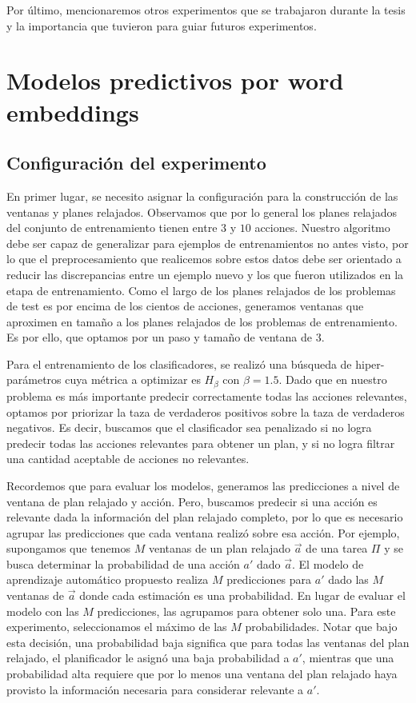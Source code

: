 Por último, mencionaremos otros experimentos que se trabajaron durante la tesis
y la importancia que tuvieron para guiar futuros experimentos.

\section{Modelos predictivos por word embeddings}
\label{exp:ad-hoc}

\subsection{Configuración del experimento}

En primer lugar, se necesito asignar la configuración para la construcción de
las ventanas y planes relajados.  Observamos que por lo general los planes
relajados del conjunto de entrenamiento tienen entre $3$ y $10$ acciones.
Nuestro algoritmo debe ser capaz de generalizar para ejemplos de entrenamientos
no antes visto, por lo que el preprocesamiento que realicemos sobre estos datos
debe ser orientado a reducir las discrepancias entre un ejemplo nuevo y los que
fueron utilizados en la etapa de entrenamiento. Como el largo de los planes
relajados de los problemas de test es por encima de los cientos de acciones,
generamos ventanas que aproximen en tamaño a los planes relajados de los
problemas de entrenamiento. Es por ello, que optamos por un paso y tamaño de
ventana de $3$.

Para el entrenamiento de los clasificadores, se realizó una búsqueda de
hiper-parámetros cuya métrica a optimizar es $H_{\beta}$ con $\beta = 1.5$. Dado
que en nuestro problema es más importante predecir correctamente todas las
acciones relevantes, optamos por priorizar la taza de verdaderos positivos sobre
la taza de verdaderos negativos. Es decir, buscamos que el clasificador sea
penalizado si no logra predecir todas las acciones relevantes para obtener un
plan, y si no logra filtrar una cantidad aceptable de acciones no relevantes.

Recordemos que para evaluar los modelos, generamos las predicciones a nivel de
ventana de plan relajado y acción. Pero, buscamos predecir si una acción
es relevante dada la información del plan relajado completo, por lo que es
necesario agrupar las predicciones que cada ventana realizó sobre esa acción.
Por ejemplo, supongamos que tenemos $M$ ventanas de un plan relajado $\vec{a}$
de una tarea $\Pi$ y se busca determinar la probabilidad de una acción $a'$ dado
$\vec{a}$. El modelo de aprendizaje automático propuesto realiza $M$
predicciones para $a'$ dado las $M$ ventanas de $\vec{a}$ donde cada estimación
es una probabilidad. En lugar de evaluar el modelo con las $M$ predicciones, las
agrupamos para obtener solo una. Para este experimento, seleccionamos el máximo
de las $M$ probabilidades. Notar que bajo esta decisión, una probabilidad baja
significa que para todas las ventanas del plan relajado, el planificador le
asignó una baja probabilidad a $a'$, mientras que una probabilidad alta requiere
que por lo menos una ventana del plan relajado haya provisto la información
necesaria para considerar relevante a $a'$.


